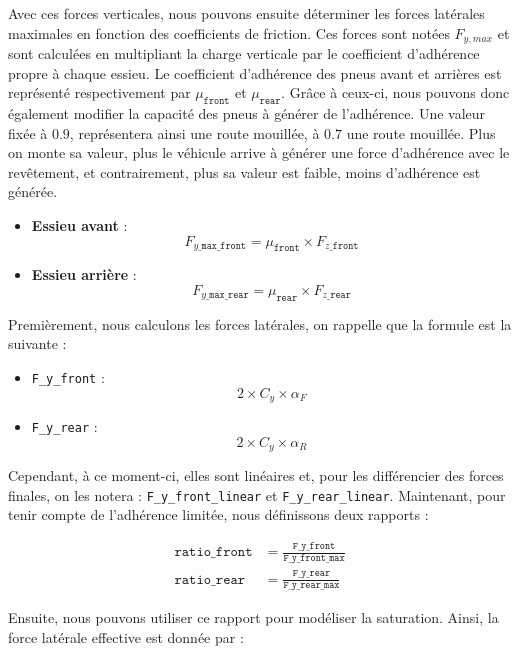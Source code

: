 Avec ces forces verticales, nous pouvons ensuite déterminer les forces latérales maximales en fonction des coefficients de friction. Ces forces sont notées $F_{y, max}$ et sont calculées en multipliant la charge verticale par le coefficient d'adhérence propre à chaque essieu. Le coefficient d'adhérence des pneus avant et arrières est représenté respectivement par $\mu_{\texttt{front}}$ et $\mu_{\texttt{rear}}$. Grâce à ceux-ci, nous pouvons donc également modifier la capacité des pneus à générer de l'adhérence. Une valeur fixée à $0.9$, représentera ainsi une route mouillée, à $0.7$ une route mouillée. Plus on monte sa valeur, plus le véhicule arrive à générer une force d'adhérence avec le revêtement, et contrairement, plus sa valeur est faible, moins d'adhérence est générée.

\begin{itemize}
    \item \textbf{Essieu avant} :
    $$F_{y\_\texttt{max\_front}}= \mu_{\texttt{front}} \times F_{z\_\texttt{front}}$$
    \item \textbf{Essieu arrière} :
    $$F_{y\_\texttt{max\_rear}} = \mu_{\texttt{rear}} \times F_{z\_\texttt{rear}}$$
\end{itemize}

Premièrement, nous calculons les forces latérales, on rappelle que la formule est la suivante :

\begin{itemize}
    \item \texttt{F\_y\_front} : $$2 \times C_y \times \alpha_F$$
    \item \texttt{F\_y\_rear} : $$2 \times C_y \times \alpha_R$$
\end{itemize}

Cependant, à ce moment-ci, elles sont linéaires et, pour les différencier des forces finales, on les notera : \texttt{F\_y\_front\_linear} et \texttt{F\_y\_rear\_linear}. Maintenant, pour tenir compte de l'adhérence limitée, nous définissons deux rapports :

\begin{align}
    \texttt{ratio\_front} &= \frac{\texttt{F\_y\_front}}{\texttt{F\_y\_front\_max}} \\
    \texttt{ratio\_rear} &= \frac{\texttt{F\_y\_rear}}{\texttt{F\_y\_rear\_max}}
\end{align}

Ensuite, nous pouvons utiliser ce rapport pour modéliser la saturation. Ainsi, la force latérale effective est donnée par :

